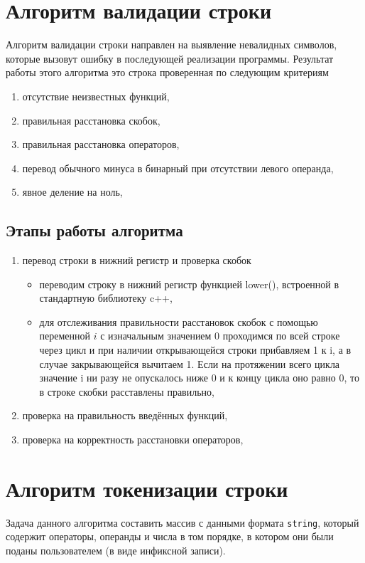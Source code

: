 \section{Алгоритм валидации строки}
Алгоритм валидации строки направлен на выявление невалидных символов, которые вызовут ошибку в последующей реализации программы. Результат работы этого алгоритма это строка проверенная по следующим критериям
\begin{enumerate}
	\item отсутствие неизвестных функций,
	\item правильная расстановка скобок,
	\item правильная расстановка операторов,
	\item перевод обычного минуса в бинарный при отсутствии левого операнда,
	\item явное деление на ноль,
\end{enumerate}
\newpage
\subsection*{Этапы работы алгоритма}
\begin{enumerate}
	\item перевод строки в нижний регистр и проверка скобок	
	\begin{itemize}
		\item переводим строку в нижний регистр функцией lower(), встроенной в стандартную библиотеку c++,
		\item для отслеживания правильности расстановок скобок с помощью переменной $i$ с изначальным значением 0 проходимся по всей строке через цикл и при наличии открывающейся строки прибавляем 1 к i, а в случае закрывающейся вычитаем 1. Если на протяжении всего цикла значение i ни разу не опускалось ниже 0 и к концу цикла оно равно 0, то в строке скобки расставлены правильно,
	\end{itemize}
	
	\item проверка на правильность введённых функций,
	\item проверка на корректность расстановки операторов,
\end{enumerate}
\section{Алгоритм токенизации строки}
Задача данного алгоритма составить массив с данными формата \texttt{string}, который содержит операторы, операнды и числа в том порядке, в котором они были поданы пользователем (в виде инфиксной записи).
